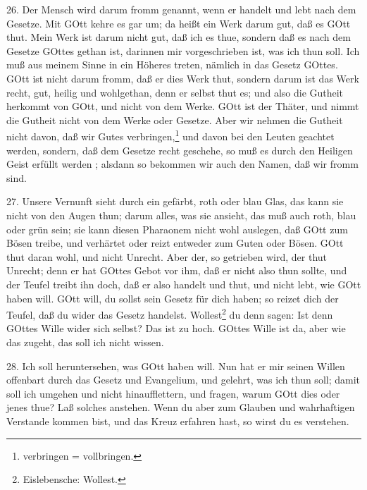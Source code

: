 26. Der Mensch wird darum fromm genannt, wenn er handelt und lebt nach dem Gesetze. Mit GOtt kehre es gar um; da heißt ein Werk darum gut, daß es GOtt thut. Mein Werk ist darum nicht gut, daß ich es thue, sondern daß es nach dem Gesetze GOttes gethan ist, darinnen mir vorgeschrieben ist, was ich thun soll. Ich muß aus meinem Sinne in ein Höheres treten, nämlich in das Gesetz GOttes. GOtt ist nicht darum fromm, daß er dies Werk thut, sondern darum ist das Werk recht, gut, heilig und wohlgethan, denn er selbst thut es; und also die Gutheit herkommt von GOtt, und nicht von dem Werke. GOtt ist der Thäter, und nimmt die Gutheit nicht von dem Werke oder Gesetze. Aber wir nehmen die Gutheit nicht davon, daß wir Gutes verbringen,\footnote{verbringen = vollbringen.} und davon bei den Leuten geachtet werden, sondern, daß dem Gesetze recht geschehe, so muß es durch den Heiligen Geist erfüllt werden
; alsdann so bekommen wir auch den Namen, daß wir fromm sind.

27. Unsere Vernunft sieht durch ein gefärbt, roth oder blau Glas, das kann sie nicht von den Augen thun; darum alles, was sie ansieht, das muß auch roth, blau oder grün sein; sie kann diesen Pharaonem nicht wohl auslegen, daß GOtt zum Bösen treibe, und verhärtet oder reizt entweder zum Guten oder Bösen. GOtt thut daran wohl, und nicht Unrecht. Aber der, so getrieben wird, der thut Unrecht; denn er hat GOttes Gebot vor ihm, daß er nicht also thun sollte, und der Teufel treibt ihn doch, daß er also handelt und thut, und nicht lebt, wie GOtt haben will. GOtt will, du sollst sein Gesetz für dich haben; so reizet dich der Teufel, daß du wider das Gesetz handelst. Wollest\footnote{Eislebensche: Wollest.} du denn sagen: Ist denn GOttes Wille wider sich selbst? Das ist zu hoch. GOttes Wille ist da, aber wie das zugeht, das soll ich nicht wissen.

28. Ich soll heruntersehen, was GOtt haben will. Nun hat er mir seinen Willen offenbart durch das Gesetz und Evangelium, und gelehrt, was ich thun soll; damit soll ich umgehen und nicht hinaufflettern, und fragen, warum GOtt dies oder jenes thue? Laß solches anstehen. Wenn du aber zum Glauben und wahrhaftigen Verstande kommen bist, und das Kreuz erfahren hast, so wirst du es verstehen.

